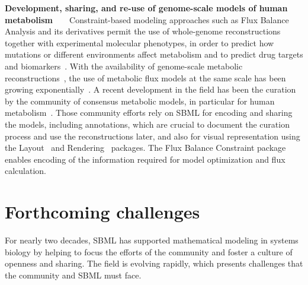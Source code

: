 \documentclass{sbml-paper}
\begin{document}
\textbf{Development, sharing, and re-use of genome-scale models of human metabolism}~~~~Constraint-based modeling approaches such as Flux Balance Analysis and its derivatives permit the use of whole-genome reconstructions together with experimental molecular phenotypes, in order to predict how mutations or different environments affect metabolism and to predict drug targets and biomarkers~\citep{savinell1992network, obrien2015}.  With the availability of genome-scale metabolic reconstructions~\citep{edwards1999systems}, the use of metabolic flux models at the same scale has been growing exponentially~\citep{Bordbar2014a}. A recent development in the field has been the curation by the community of consensus metabolic models, in particular for human metabolism~\citep{brunk2018}. Those community efforts rely on SBML for encoding and sharing the models, including annotations, which are crucial to document the curation process and use the reconstructions later, and also for visual representation using the Layout~\citep{Gauges2015} and Rendering~\citep{Bergmann2018sbml} packages. The Flux Balance Constraint package~\citep{Olivier2018a} enables encoding of the information required for model optimization and flux calculation. %

\hrulefill
\newpage

\section*{Forthcoming challenges}

For nearly two decades, SBML has supported mathematical modeling in systems biology by helping to focus the efforts of the community and foster a culture of openness and sharing.  The field is evolving rapidly, which presents challenges that the community and SBML must face.
\end{document}
